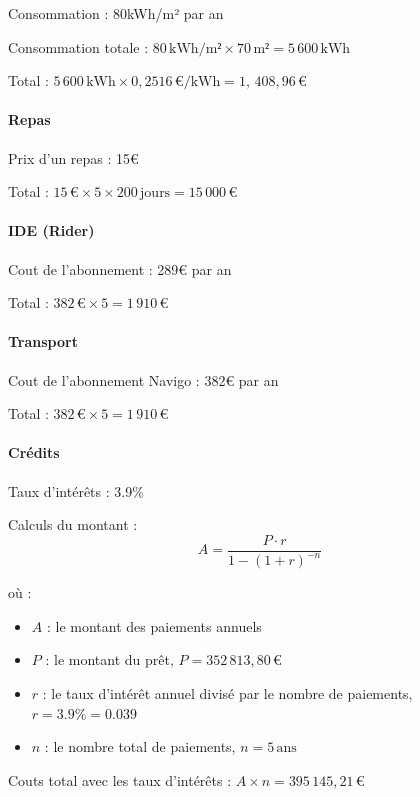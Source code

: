 \documentclass{article}
\begin{document}
Consommation : 80kWh/m² par an

Consommation totale : $80\,\text{kWh/m²} \times 70\,\text{m²} = 5\,600\,\text{kWh}$

Total : $5\,600\,\text{kWh} \times 0,2516\,\text{€/kWh} = 1,\,408,96\,\text{€}$

\paragraph{Repas}\hfill

Prix d'un repas : 15€

Total : $15\,\text{€} \times 5 \times 200\,\text{jours} = 15\,000\,\text{€}$

\paragraph{IDE (Rider)}\hfill

Cout de l'abonnement : 289€ par an

Total : $382\,\text{€} \times 5 = 1\,910\,\text{€}$

\paragraph{Transport}\hfill

Cout de l'abonnement Navigo : 382€ par an

Total : $382\,\text{€} \times 5 = 1\,910\,\text{€}$

\paragraph{Crédits}\hfill

Taux d'intérêts : 3.9\%

Calculs du montant :
\[
A = \frac{P \cdot r}{1 - (1 + r)^{-n}}
\]

où :

\begin{itemize}
    \item \(A\) : le montant des paiements annuels
    \item \(P\) : le montant du prêt, \(P = 352\,813,80\,\text{€}\)
    \item \(r\) : le taux d'intérêt annuel divisé par le nombre de paiements, \(r = 3.9\% = 0.039\)
    \item \(n\) : le nombre total de paiements, \(n = 5 \, \text{ans}\)
\end{itemize}

Couts total avec les taux d'intérêts : $A \times n = 395\,145,21\,\text{€}$
\end{document}
